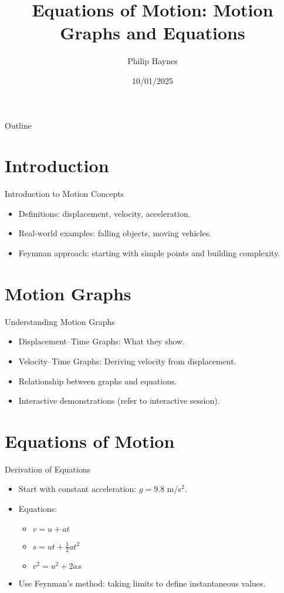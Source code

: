 \documentclass[xcolor=svgnames]{beamer}
\title[Equations of Motion]{Equations of Motion: Motion Graphs and Equations}
\author[Philip Haynes]{Philip Haynes}
\institute[Gosford High School]{Gosford High School}
\date{10/01/2025}
\begin{document}
\begin{frame}
    \titlepage
\end{frame}

\begin{frame}{Outline}
    \tableofcontents
\end{frame}

\section{Introduction}
\begin{frame}{Introduction to Motion Concepts}
    \begin{itemize}
        \item Definitions: displacement, velocity, acceleration.
        \item Real-world examples: falling objects, moving vehicles.
        \item Feynman approach: starting with simple points and building complexity.
    \end{itemize}
\end{frame}

\section{Motion Graphs}
\begin{frame}{Understanding Motion Graphs}
    \begin{itemize}
        \item Displacement--Time Graphs: What they show.
        \item Velocity--Time Graphs: Deriving velocity from displacement.
        \item Relationship between graphs and equations.
        \item Interactive demonstrations (refer to interactive session).
    \end{itemize}
\end{frame}

\section{Equations of Motion}
\begin{frame}{Derivation of Equations}
    \begin{itemize}
        \item Start with constant acceleration: $g=9.8$ m/s$^2$.
        \item Equations:
        \begin{itemize}
            \item $v = u + at$
            \item $s = ut + \frac{1}{2}at^2$
            \item $v^2 = u^2 + 2as$
        \end{itemize}
        \item Use Feynman's method: taking limits to define instantaneous values.
    \end{itemize}
\end{frame}
\end{document}
